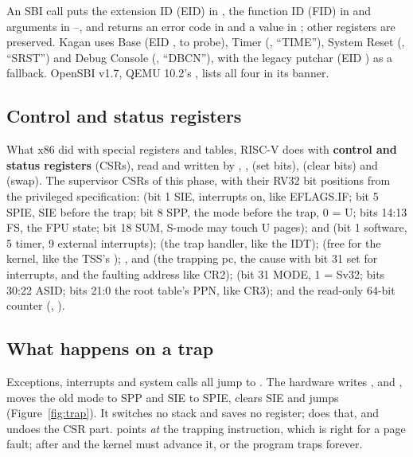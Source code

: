 \documentclass[11pt,a4paper]{article}
\begin{document}
An SBI call puts the extension ID (EID) in , the function ID (FID) in  and arguments in
--, and returns an error code in  and a value in ; other registers are preserved.
Kagan uses Base (EID , to probe), Timer (, ``TIME''), System Reset (,
``SRST'') and Debug Console (, ``DBCN''), with the legacy putchar (EID ) as a fallback.
OpenSBI v1.7, QEMU 10.2's , lists all four in its banner.

\subsection{Control and status registers}

What x86 did with special registers and tables, RISC-V does with \textbf{control and status registers} (CSRs), read
and written by , ,  (set bits),  (clear bits) and  (swap). The
supervisor CSRs of this phase, with their RV32 bit positions from the privileged specification:
 (bit 1 SIE, interrupts on, like EFLAGS.IF; bit 5 SPIE, SIE before the trap; bit 8 SPP, the mode before
the trap, 0 = U; bits 14:13 FS, the FPU state; bit 18 SUM, S-mode may touch U pages);  and  (bit 1
software, 5 timer, 9 external interrupts);  (the trap handler, like the IDT);  (free for the
kernel, like the TSS's ); ,  and  (the trapping pc, the cause with bit
31 set for interrupts, and the faulting address like CR2);  (bit 31 MODE, 1 = Sv32; bits 30:22 ASID; bits
21:0 the root table's PPN, like CR3); and the read-only 64-bit  counter (, ).

\subsection{What happens on a trap}

Exceptions, interrupts and system calls all jump to . The hardware writes ,  and
, moves the old mode to SPP and SIE to SPIE, clears SIE and jumps (Figure~\ref{fig:trap}). It switches no
stack and saves no register;  does that, and  undoes the CSR part.  points
\emph{at} the trapping instruction, which is right for a page fault; after  and  the kernel
must advance it, or the program traps forever.
\end{document}
